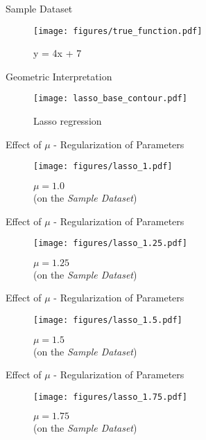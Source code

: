 \documentclass{beamer}
\begin{document}
\begin{frame}{Sample Dataset}

\begin{figure}
    \centering
    \texttt{[image: figures/true\_function.pdf]}
    \caption{y = 4x + 7}
    \label{fig:my_label}
\end{figure}{}

\end{frame}

\begin{frame}{Geometric Interpretation}
\begin{figure}
    \centering
    \texttt{[image: lasso\_base\_contour.pdf]}
    \caption{Lasso regression}
    \label{fig:my_label}
\end{figure}

\end{frame}

\begin{frame}{Effect of $\mu$ - Regularization of Parameters}
\vspace{0.4cm}
\begin{figure}

\texttt{[image: figures/lasso\_1.pdf]}
\caption{$\mu = 1.0$\\(on the \emph{Sample Dataset})}
\end{figure}
\end{frame}

\begin{frame}{Effect of $\mu$ - Regularization of Parameters}
\vspace{0.4cm}
\begin{figure}\texttt{[image: figures/lasso\_1.25.pdf]}\caption{$\mu = 1.25$\\(on the \emph{Sample Dataset})}
\end{figure}
\end{frame}

\begin{frame}{Effect of $\mu$ - Regularization of Parameters}
\vspace{0.4cm}
\begin{figure}\texttt{[image: figures/lasso\_1.5.pdf]}\caption{$\mu = 1.5$\\(on the \emph{Sample Dataset})}
\end{figure}
\end{frame}

\begin{frame}{Effect of $\mu$ - Regularization of Parameters}
\vspace{0.4cm}
\begin{figure}\texttt{[image: figures/lasso\_1.75.pdf]}\caption{$\mu = 1.75$\\(on the \emph{Sample Dataset})}
\end{figure}
\end{frame}
\end{document}
